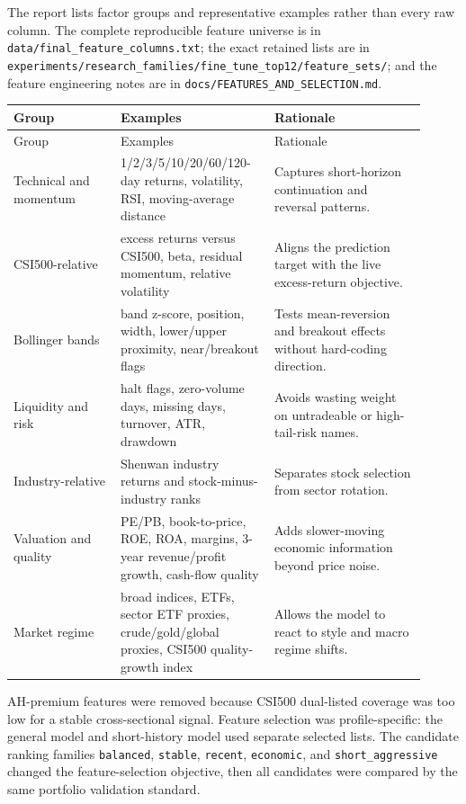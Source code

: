 \documentclass[11pt]{article}
\begin{document}
The report lists factor groups and representative examples rather than every
raw column. The complete reproducible feature universe is in
\texttt{data/final\_feature\_columns.txt}; the exact retained lists are in
\texttt{experiments/research\_families/fine\_tune\_top12/feature\_sets/}; and
the feature engineering notes are in
\texttt{docs/FEATURES\_AND\_SELECTION.md}.

\begin{longtable}{p{0.24\linewidth}p{0.33\linewidth}p{0.34\linewidth}}
\toprule
Group & Examples & Rationale \\
\midrule
\endfirsthead
\toprule
Group & Examples & Rationale \\
\midrule
\endhead
Technical and momentum & 1/2/3/5/10/20/60/120-day returns, volatility, RSI, moving-average distance & Captures short-horizon continuation and reversal patterns. \\
CSI500-relative & excess returns versus CSI500, beta, residual momentum, relative volatility & Aligns the prediction target with the live excess-return objective. \\
Bollinger bands & band z-score, position, width, lower/upper proximity, near/breakout flags & Tests mean-reversion and breakout effects without hard-coding direction. \\
Liquidity and risk & halt flags, zero-volume days, missing days, turnover, ATR, drawdown & Avoids wasting weight on untradeable or high-tail-risk names. \\
Industry-relative & Shenwan industry returns and stock-minus-industry ranks & Separates stock selection from sector rotation. \\
Valuation and quality & PE/PB, book-to-price, ROE, ROA, margins, 3-year revenue/profit growth, cash-flow quality & Adds slower-moving economic information beyond price noise. \\
Market regime & broad indices, ETFs, sector ETF proxies, crude/gold/global proxies, CSI500 quality-growth index & Allows the model to react to style and macro regime shifts. \\
\bottomrule
\end{longtable}

AH-premium features were removed because CSI500 dual-listed coverage was too
low for a stable cross-sectional signal. Feature selection was profile-specific:
the general model and short-history model used separate selected lists. The
candidate ranking families \texttt{balanced}, \texttt{stable}, \texttt{recent},
\texttt{economic}, and \texttt{short\_aggressive} changed the feature-selection
objective, then all candidates were compared by the same portfolio validation
standard.
\end{document}
